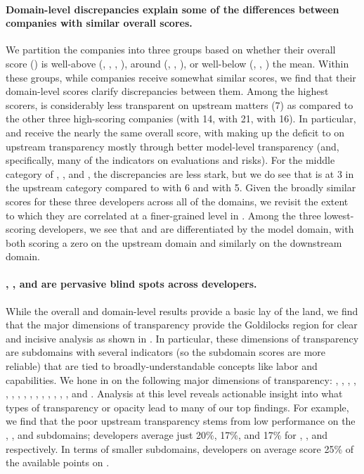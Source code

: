 \documentclass[screen, authorversion, acmsmall]{acmart}
\begin{document}
\paragraph{Domain-level discrepancies explain some of the differences between companies with similar overall scores.}
We partition the \numcompanies companies into three groups based on whether their overall score () is well-above (\meta, \huggingface, \openai, \stability), around (\google, \anthropic, \cohere), or well-below (\aitwentyone, \inflection, \amazon) the mean. 
Within these groups, while companies receive somewhat similar scores, we find that their domain-level scores clarify discrepancies between them. 
Among the highest scorers, \openai is considerably less transparent on upstream matters (7) as compared to the other three high-scoring companies (\meta with 14, \huggingface with 21, \stability with 16).
In particular, \openai and \stability receive the nearly the same overall score, with \openai making up the deficit to \stability on upstream transparency mostly through better model-level transparency (and, specifically, many of the indicators on evaluations and risks).
For the middle category of \google, \anthropic, and \cohere, the discrepancies are less stark, but we do see that \cohere is at 3 in the upstream category compared to \google with 6 and \anthropic with 5.
Given the broadly similar scores for these three developers across all of the domains, we revisit the extent to which they are correlated at a finer-grained level in .
Among the three lowest-scoring developers, we see that \aitwentyone and \inflection are differentiated by the model domain, with both scoring a zero on the upstream domain and similarly on the downstream domain.

\paragraph{\data, \labor, and \compute are pervasive blind spots across developers.} 
While the overall and domain-level results provide a basic lay of the land, we find that the major dimensions of transparency provide the Goldilocks region for clear and incisive analysis as shown in .
In particular, these dimensions of transparency are subdomains with several indicators (so the subdomain scores are more reliable) that are tied to broadly-understandable concepts like labor and capabilities. 
We hone in on the following major dimensions of transparency: \data, \labor, \compute, \methods, \modelbasics, \modelaccess, \capabilities, \risks, \modelmitigations, \distribution, \usagepolicy, \modelbehaviorpolicy, \updates, \dataprotection, \feedback, and \impact. 
Analysis at this level reveals actionable insight into what types of transparency or opacity lead to many of our top findings. 
For example, we find that the poor upstream transparency stems from low performance on the \data, \labor, and \compute subdomains; developers average just 20\%, 17\%, and 17\% for \data, \labor, and \compute respectively. 
In terms of smaller subdomains, developers on average score 25\% of the available points on \datamitigations.
\end{document}

